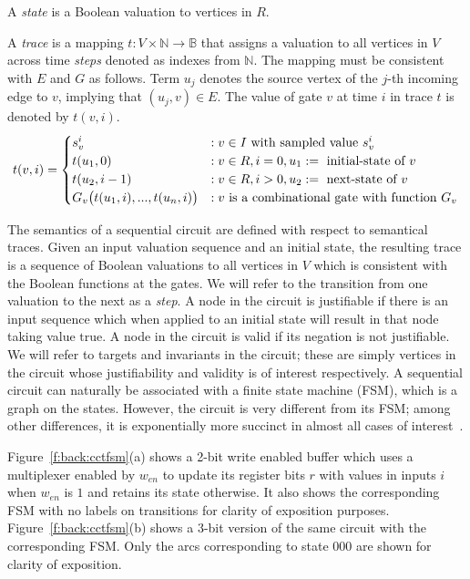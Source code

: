 \begin{definition}[State]
\rm A {\em state} is a Boolean valuation to vertices in $R$. 
\end{definition}

\begin{definition}[Trace]
\rm A {\em trace} is a mapping $t: V \times \mathbb{N} \rightarrow
\mathbb{B}$ that assigns a valuation to all vertices in
$V$ across time {\em steps} denoted as indexes from
$\mathbb{N}$.  The mapping must be consistent with $E$ and
$G$ as follows.  Term $u_{j}$ denotes the source vertex of
the $j$-th incoming edge to $v$, implying that
$(u_{j},v)\in E$.  The value of gate $v$ at time $i$ in
trace $t$ is denoted by $t(v,i)$.
\[
t(v,i)=
   \begin{cases}
      s^i_{v}            &:v \in I \ \text{with sampled value $s_{v}^i$}\\
      t(u_1, 0)       &:v \in R,i=0,u_1:=\ \text{initial-state of $v$}\\
      t(u_2, i-1)        &:v \in R,i>0,u_2:=\ \text{next-state of $v$}\\
      G_v\big(t(u_{1},i),...,t(u_{n},i)\big) &: v \ \text{is a combinational gate with function 
$G_v$}
   \end{cases} \\
\]
\end{definition}

The semantics of a sequential circuit are defined with
respect to semantical traces.  Given an input valuation
sequence and an initial state, the resulting trace is a
sequence of Boolean valuations to all vertices in $V$
which is consistent with the Boolean functions at the
gates.  We will refer to the transition from one valuation
to the next as a {\em step}.  A node in the circuit is
justifiable if there is an input sequence which when
applied to an initial state will result in that node
taking value $\mbox{true}$.  A node in the circuit is
valid if its negation is not justifiable.  We will refer
to targets and invariants in the circuit; these are simply
vertices in the circuit whose justifiability and validity
is of interest respectively.
A sequential circuit can naturally
be associated with a finite state machine (FSM),
which is a graph on the states.  However, the 
circuit is very different from its FSM; among
other differences, it is exponentially more succinct in
almost all cases of interest~\cite{BuClMcDiHw92}. 

Figure~\ref{f:back:cctfsm}(a) shows a 2-bit write enabled 
buffer which uses a multiplexer enabled by $w_{en}$ to 
update its register bits $r$ with values in inputs $i$ 
when $w_{en}$ is $1$ and retains its state otherwise.
It also shows the corresponding FSM with no labels on
transitions for clarity of exposition purposes.
Figure~\ref{f:back:cctfsm}(b) shows a 3-bit version of 
the same circuit with the corresponding FSM. 
Only the arcs corresponding to state $000$ are shown for 
clarity of exposition.

